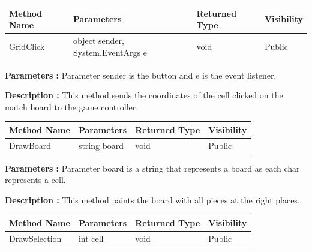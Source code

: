 \documentclass[12pt]{article}
\begin{document}
    \begin{table}[H]
        \begin{tabular}{|l|l|l|l|}
            \hline
            \rowcolor[HTML]{EFEFEF}
            \cellcolor[HTML]{EFEFEF}\textbf{Method Name} & \textbf{Parameters}               & \textbf{Returned Type} & \textbf{Visibility} \\ \hline
            GridClick                                    & object sender, System.EventArgs e & void                   & Public              \\ \hline
        \end{tabular}
    \end{table}

    \textbf{Parameters :} Parameter sender is the button and e is the event listener.

    \textbf{Description :} This method sends the coordinates of the cell clicked on the match board to the game controller.

    \begin{table}[H]
        \begin{tabular}{|l|l|l|l|}
            \hline
            \rowcolor[HTML]{EFEFEF}
            \cellcolor[HTML]{EFEFEF}\textbf{Method Name} & \textbf{Parameters} & \textbf{Returned Type} & \textbf{Visibility} \\ \hline
            DrawBoard                                    & string board        & void                   & Public              \\ \hline
        \end{tabular}
    \end{table}

    \textbf{Parameters :} Parameter board is a string that represents a board as each char represents a cell.

    \textbf{Description :} This method paints the board with all pieces at the right places.

    \begin{table}[H]
        \begin{tabular}{|l|l|l|l|}
            \hline
            \rowcolor[HTML]{EFEFEF}
            \cellcolor[HTML]{EFEFEF}\textbf{Method Name} & \textbf{Parameters} & \textbf{Returned Type} & \textbf{Visibility} \\ \hline
            DrawSelection                                & int cell            & void                   & Public              \\ \hline
        \end{tabular}
    \end{table}
\end{document}
